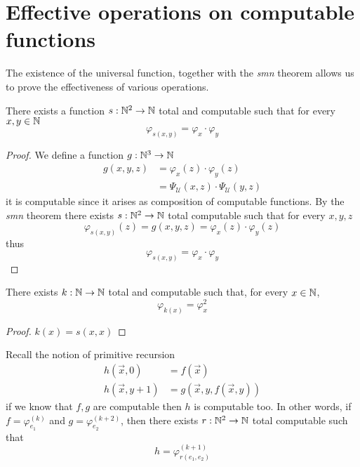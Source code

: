 \section{Effective operations on computable functions}
The existence of the universal function, together with the \emph{smn}
theorem allows us to prove the effectiveness of various
operations.
\begin{proposition}
  There exists a function $s: \mathbb{N}^2 \rightarrow \mathbb{N}$ total and computable
such that for every $x, y \in \mathbb{N}$
 \[\varphi_{s(x,y)} = \varphi_x \cdot \varphi_y\]
\begin{proof}
  We define a function $g : \mathbb{N}^3 \to \mathbb{N}$
  \begin{align*}
    g(x,y,z) &= \varphi_x(z) \cdot \varphi_y(z) \\
    &= \Psi_{\mathcal{U}}(x,z) \cdot \Psi_{\mathcal{U}}(y,z)
  \end{align*}
  it is computable since it arises as composition of computable functions. 
  By the \emph{smn} theorem there
  exists $s: \mathbb{N}^2 \rightarrow \mathbb{N}$ total computable such that for every $x,y,z$
  \[
    \varphi_{s(x,y)}(z) = g(x,y,z) = \varphi_x(z) \cdot \varphi_y(z)
  \]
  thus
  \[
    \varphi_{s(x,y)} = \varphi_x \cdot \varphi_y
  \]
\end{proof}
\end{proposition}


\begin{proposition}
There exists $k:\mathbb{N} \to \mathbb{N}$ total and computable such that, for every $x \in \mathbb{N}$,
\[\varphi_{k(x)} = \varphi_x^2\]
\begin{proof}
$k(x) = s(x,x)$
\end{proof}
\end{proposition}

\begin{proposition}
Recall the notion of primitive recursion
\begin{align*}
  h(\vec{x}, 0) &= f(\vec{x}) \\
  h(\vec{x}, y+1) &= g(\vec{x}, y, f(\vec{x},y))
\end{align*}
if we know that
$f,g$ are computable then $h$ is computable too. In other words, if
$f = \varphi_{e_1}^{(k)}$ and $g = \varphi_{e_2}^{(k+2)}$, then there exists $r: \mathbb{N}^2 \rightarrow \mathbb{N}$ total
computable such that
\[h = \varphi_{r(e_1, e_2)}^{(k+1)}\]
\end{proposition}

